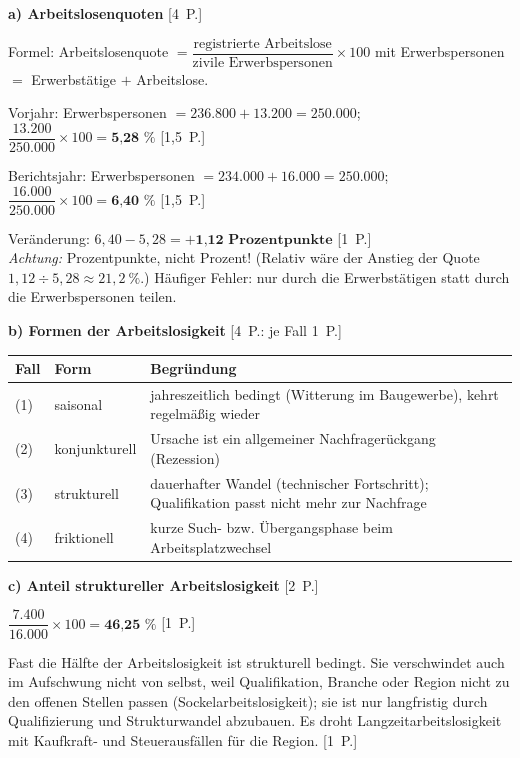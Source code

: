 \begin{loesung}[title={Lösung Aufgabe~3.4 --- Regionaler Arbeitsmarkt}]
\textbf{a) Arbeitslosenquoten} \hfill [4~P.]

Formel: Arbeitslosenquote $= \dfrac{\text{registrierte Arbeitslose}}{\text{zivile
Erwerbspersonen}} \times 100$ mit Erwerbspersonen $=$ Erwerbstätige $+$ Arbeitslose.

Vorjahr: Erwerbspersonen $= 236.800 + 13.200 = 250.000$;\quad
$\dfrac{13.200}{250.000} \times 100 = \textbf{5,28~\%}$ [1,5~P.]

Berichtsjahr: Erwerbspersonen $= 234.000 + 16.000 = 250.000$;\quad
$\dfrac{16.000}{250.000} \times 100 = \textbf{6,40~\%}$ [1,5~P.]

Veränderung: $6{,}40 - 5{,}28 = \textbf{+1,12~Prozentpunkte}$ [1~P.]\\
{\small \emph{Achtung:} Prozentpunkte, nicht Prozent! (Relativ wäre der Anstieg der
Quote $1{,}12 \div 5{,}28 \approx 21{,}2~\%$.) Häufiger Fehler: nur durch die
Erwerbstätigen statt durch die Erwerbspersonen teilen.}

\medskip
\textbf{b) Formen der Arbeitslosigkeit} \hfill [4~P.: je Fall 1~P.]

\begin{tabular}{p{1.1cm} p{2.6cm} p{9.4cm}}
\toprule
\textbf{Fall} & \textbf{Form} & \textbf{Begründung}\\
\midrule
(1) & saisonal & jahreszeitlich bedingt (Witterung im Baugewerbe), kehrt regelmäßig wieder\\
(2) & konjunkturell & Ursache ist ein allgemeiner Nachfragerückgang (Rezession)\\
(3) & strukturell & dauerhafter Wandel (technischer Fortschritt); Qualifikation passt nicht mehr zur Nachfrage\\
(4) & friktionell & kurze Such- bzw. Übergangsphase beim Arbeitsplatzwechsel\\
\bottomrule
\end{tabular}

\medskip
\textbf{c) Anteil struktureller Arbeitslosigkeit} \hfill [2~P.]

$\dfrac{7.400}{16.000} \times 100 = \textbf{46,25~\%}$ [1~P.]

Fast die Hälfte der Arbeitslosigkeit ist strukturell bedingt. Sie verschwindet auch im
Aufschwung nicht von selbst, weil Qualifikation, Branche oder Region nicht zu den offenen
Stellen passen (Sockelarbeitslosigkeit); sie ist nur langfristig durch Qualifizierung und
Strukturwandel abzubauen. Es droht Langzeitarbeitslosigkeit mit Kaufkraft- und
Steuerausfällen für die Region. [1~P.]


\end{loesung}
